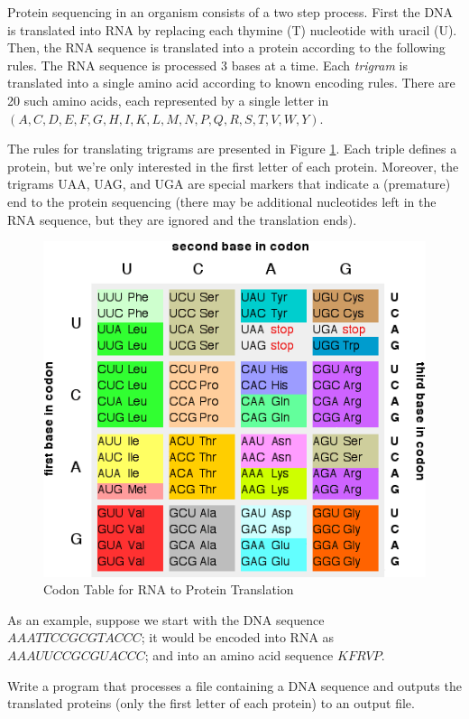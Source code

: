 \begin{exer}
Protein sequencing in an organism consists of a two step 
process.  First the DNA is translated into RNA by replacing 
each thymine (T) nucleotide with uracil (U).  Then, the RNA 
sequence is translated into a protein according to the following 
rules.  The RNA sequence is processed 3 bases at a time.  
Each \emph{trigram} is translated into a single amino acid
according to known encoding rules.  There are 20 such amino 
acids, each represented by a single letter in $(A,C,D,E,F,G,H,I,K,L,M,N,P,Q,R,S,T,V,W,Y)$.

The rules for translating trigrams are presented in Figure 
\ref{figure:codonTable}.  Each triple defines a protein, 
but we're only interested in the first letter of each protein.
Moreover, the trigrams UAA, UAG, and UGA are special 
markers that indicate a (premature) end to the protein 
sequencing (there may be additional nucleotides left in the 
RNA sequence, but they are ignored and the translation 
ends).  

\begin{figure}[h]
\centering
\includegraphics[scale=0.65]{images/codonTable}
\caption{Codon Table for RNA to Protein Translation}
\label{figure:codonTable}
\end{figure}

As an example, suppose we start with the DNA sequence 
$AAATTCCGCGTACCC$; it would be encoded into RNA
as $AAAUUCCGCGUACCC$; and into an amino acid 
sequence $KFRVP$.

Write a program that processes a file containing a DNA
sequence and outputs the translated proteins (only the
first letter of each protein) to an output file.
\end{exer}

